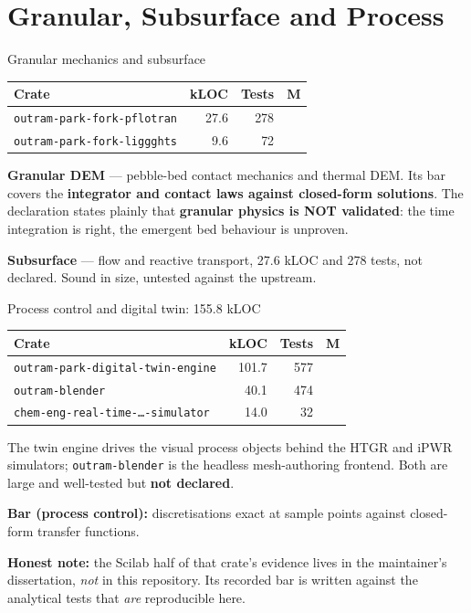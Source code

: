 \documentclass[aspectratio=169]{beamer}
\newcommand{\statustab}[1]{{\footnotesize\setlength{\tabcolsep}{4pt}#1}}
\begin{document}
\section{Granular, Subsurface and Process}

\begin{frame}{Granular mechanics and subsurface}
    \statustab{
    \begin{tabular}{lrrc}
        \toprule
        \textbf{Crate} & \textbf{kLOC} & \textbf{Tests} & \textbf{M} \\
        \midrule
        \texttt{outram-park-fork-pflotran} & 27.6 & 278 & \\
        \texttt{outram-park-fork-liggghts} &  9.6 &  72 & \checkmark \\
        \bottomrule
    \end{tabular}}

    \medskip
    \textbf{Granular DEM} \parencite{kloss2012models} --- pebble-bed contact
    mechanics and thermal DEM. Its bar covers the \textbf{integrator and
    contact laws against closed-form solutions}. The declaration states
    plainly that \textbf{granular physics is NOT validated}: the time
    integration is right, the emergent bed behaviour is unproven.

    \medskip
    \textbf{Subsurface} \parencite{hammond2014pflotran} --- flow and reactive
    transport, 27.6 kLOC and 278 tests, not declared. Sound in size, untested
    against the upstream.
\end{frame}

\begin{frame}{Process control and digital twin: 155.8 kLOC}
    \statustab{
    \begin{tabular}{lrrc}
        \toprule
        \textbf{Crate} & \textbf{kLOC} & \textbf{Tests} & \textbf{M} \\
        \midrule
        \texttt{outram-park-digital-twin-engine} & 101.7 & 577 & \\
        \texttt{outram-blender}                  &  40.1 & 474 & \\
        \texttt{chem-eng-real-time-\dots-simulator} & 14.0 & 32 & \checkmark \\
        \bottomrule
    \end{tabular}}

    \medskip
    The twin engine drives the visual process objects behind the HTGR and iPWR
    simulators; \texttt{outram-blender} \parencite{blender} is the headless
    mesh-authoring frontend. Both are large and well-tested but
    \textbf{not declared}.

    \medskip
    \textbf{Bar (process control):} discretisations exact at sample points
    against closed-form transfer functions.

    \medskip
    \textbf{Honest note:} the Scilab half of that crate's evidence lives in the
    maintainer's dissertation, \emph{not} in this repository. Its recorded bar
    is written against the analytical tests that \emph{are} reproducible here.
\end{frame}
\end{document}
